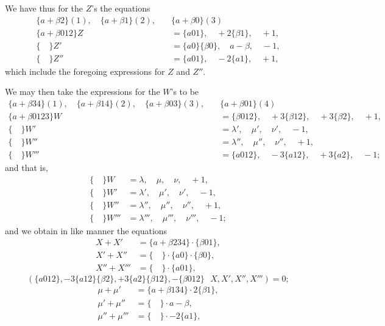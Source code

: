 \documentclass[12pt,a4paper]{article}
\theoremstyle{cayley}
\theoremstyle{definition}
\numberwithin{equation}{section}
\begin{document}
We have thus for the $Z$'s the equations
\begin{align*}
\{a + \beta 2\}(1), \quad \{a + \beta 1\}(2), \quad &\{a + \beta 0\}(3) \\
\{a + \beta 012\}Z &= \{a01\}, \quad +2\{\beta 1\}, \quad +1, \\
\{ \quad \}Z' &= \{a0\}\{\beta 0\}, \quad a - \beta, \quad -1, \\
\{ \quad \}Z'' &= \{a01\}, \quad -2\{a1\}, \quad +1,
\end{align*}
which include the foregoing expressions for $Z$ and $Z''$.

We may then take the expressions for the $W$'s to be
\begin{align*}
\{a + \beta 34\}(1), \quad \{a + \beta 14\}(2), \quad \{a + \beta 03\}(3), \quad &\{a + \beta 01\}(4) \\
\{a + \beta 0123\}W &= \{\beta 012\}, \quad +3\{\beta 12\}, \quad +3\{\beta 2\}, \quad +1, \\
\{ \quad \}W' &= \lambda', \quad \mu', \quad \nu', \quad -1, \\
\{ \quad \}W'' &= \lambda'', \quad \mu'', \quad \nu'', \quad +1, \\
\{ \quad \}W''' &= \{a012\}, \quad -3\{a12\}, \quad +3\{a2\}, \quad -1;
\end{align*}
and that is,
\begin{align*}
\{ \quad \}W &= \lambda, \quad \mu, \quad \nu, \quad +1, \\
\{ \quad \}W' &= \lambda', \quad \mu', \quad \nu', \quad -1, \\
\{ \quad \}W'' &= \lambda'', \quad \mu'', \quad \nu'', \quad +1, \\
\{ \quad \}W''' &= \lambda''', \quad \mu''', \quad \nu''', \quad -1;
\end{align*}
and we obtain in like manner the equations
\begin{align*}
X + X' &= \{a + \beta 234\} \cdot \{\beta 01\}, \\
X' + X'' &= \{ \quad \} \cdot \{a0\} \cdot \{\beta 0\}, \\
X'' + X''' &= \{ \quad \} \cdot \{a01\},
\end{align*}
\[
(\{a012\}, -3\{a12\}\{\beta2\}, +3\{a2\}\{\beta12\}, -\{\beta012\} \,\,\,\, X, X', X'', X''') = 0;
\]
\begin{align*}
\mu + \mu' &= \{a + \beta 134\} \cdot 2\{\beta 1\}, \\
\mu' + \mu'' &= \{ \quad \} \cdot a - \beta, \\
\mu'' + \mu''' &= \{ \quad \} \cdot -2\{a1\},
\end{align*}
\end{document}
